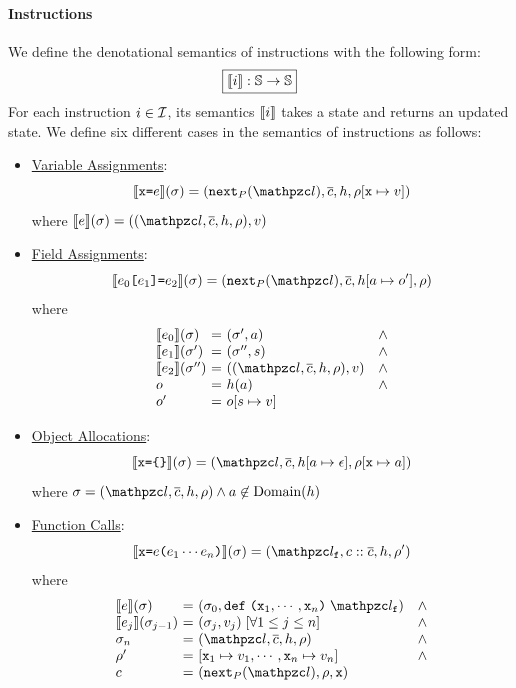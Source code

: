 \paragraph{Instructions} We define the denotational semantics of instructions
with the following form:
\[
  \framebox{$\sem{\inst}: \stset \rightarrow \stset$}
\]
For each instruction $i \in \mathcal{I}$, its semantics $\llbracket{i}\rrbracket$ takes a
state and returns an updated state. We define six different cases in the
semantics of instructions as follows:

\begin{itemize}
  \item \underline{Variable Assignments}:
    \[
      \sem{\varx \kweq \expr}(\st) =
      (\getnext{\prog}(\lab), \ctxts, \heap, \env[\varx \mapsto \val])
    \]
    where $\sem{\expr}(\st) = ((\lab, \ctxts, \heap, \env), \val)$

  \item \underline{Field Assignments}:
    \[
      \sem{\expr_0 \kwsl \expr_1 \kwsr \kweq \expr_2}(\st) =
      (\getnext{\prog}(\lab), \ctxts, \heap[\addr \mapsto \obj'], \env)
    \]
    where
    \[
      \begin{array}{l@{~}c@{~}ll}
        \sem{\expr_0}(\st) &=& (\st', \addr) &\wedge\\
        \sem{\expr_1}(\st') &=& (\st'', \str) &\wedge\\
        \sem{\expr_2}(\st'') &=& ((\lab, \ctxts, \heap, \env), \val) &\wedge\\
        \obj &=& \heap(\addr) &\wedge\\
        \obj' &=& \obj[\str \mapsto \val]\\
      \end{array}
    \]

  \item \underline{Object Allocations}:
    \[
      \sem{\varx \kweq \kwcl \kwcr}(\st) =
      (\lab, \ctxts, \heap[\addr \mapsto \epsilon], \env[\varx \mapsto
      \addr])
    \]
    where $\st = (\lab, \ctxts, \heap, \env) \wedge \addr \not\in
    \text{Domain}(\heap)$

  \item \underline{Function Calls}:
    \[
      \sem{\varx \kweq \expr \kwrl \expr_1 \cdots \expr_n \kwrr}(\st) =
      (\lab_\varf, \ctxt :: \ctxts, \heap, \env')
    \]
    where
    \[
      \begin{array}{l@{~}c@{~}ll}
        \sem{\expr}(\st) &=& (\st_0, \kwdef \; \kwrl \varx_1, \cdots, \varx_n
        \kwrr \; \lab_\varf) &\wedge\\
        \sem{\expr_j}(\st_{j-1}) &=& (\st_j, \val_j) \;
        [\forall 1 \leq j \leq n] &\wedge\\
        \st_n &=& (\lab, \ctxts, \heap, \env) &\wedge\\
        \env' &=& [\varx_1 \mapsto \val_1, \cdots, \varx_n \mapsto \val_n]
        &\wedge\\
        \ctxt &=& (\getnext{\prog}(\lab), \env, \varx)\\
      \end{array}
    \]


\end{itemize}
